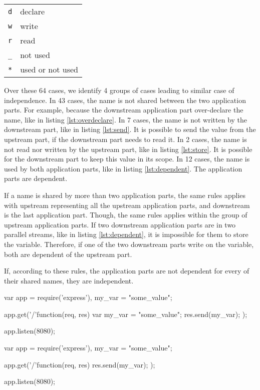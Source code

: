 \begin{tabular}{r | l}
\texttt{d} & declare \\
\texttt{w} & write \\
\texttt{r} & read \\
\texttt{_} & not used \\
\texttt{*} & used or not used \\
\end{tabular}

Over these 64 cases, we identify 4 groups of cases leading to similar case of independence.
In 43 cases, the name is not shared between the two application parts.
For example, because the downstream application part over-declare the name, like in listing \ref{lst:overdeclare}.
In 7 cases, the name is not written by the downstream part, like in listing \ref{lst:send}.
It is possible to send the value from the upstream part, if the downstream part needs to read it.
In 2 cases, the name is not read nor written by the upstream part, like in listing \ref{lst:store}.
It is possible for the downstream part to keep this value in its scope.
In 12 cases, the name is used by both application parts, like in listing \ref{lst:dependent}.
The application parts are dependent.

If a name is shared by more than two application parts, the same rules applies with upstream representing all the upstream application parts, and downstream is the last application part.
Though, the same rules applies within the group of upstream application parts.
If two downstream application parts are in two parallel streams, like in listing \ref{lst:dependent}, it is impossible for them to store the variable.
Therefore, if one of the two downstream parts write on the variable, both are dependent of the upstream part.

If, according to these rules, the application parts are not dependent for every of their shared names, they are independent.

\begin{code}[js, %
             caption={The downstream application part over-declare the variable}, %
             label={lst:overdeclare}] %
var app = require('express'),
    my_var = "some_value";

app.get('/'function(req, res){
  var my_var = "some_value";
  res.send(my_var);
});

app.listen(8080);
\end{code}


\begin{code}[js, %
             caption={Only he downstream application part reads the variable}, %
             label={lst:send}] %
var app = require('express'),
    my_var = "some_value";

app.get('/'function(req, res){
  res.send(my_var);
});

app.listen(8080);
\end{code}

